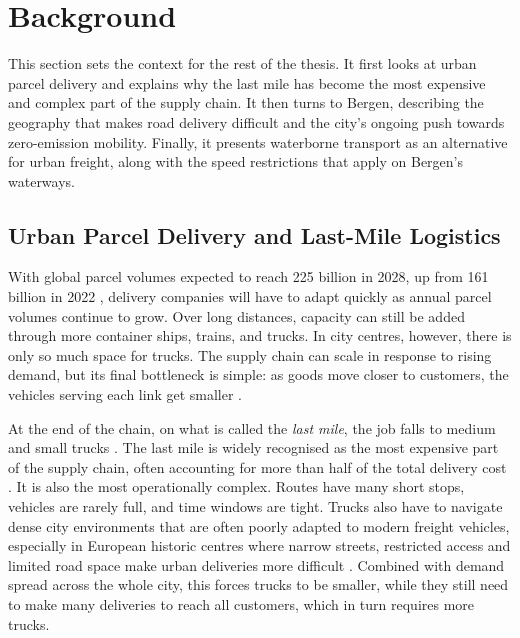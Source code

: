\documentclass[12pt]{article}
\begin{document}
\section{Background}
\label{sec:background}

This section sets the context for the rest of the thesis. It first looks at urban parcel delivery and explains why the last mile has become the most expensive and complex part of the supply chain. It then turns to Bergen, describing the geography that makes road delivery difficult and the city's ongoing push towards zero-emission mobility. Finally, it presents waterborne transport as an alternative for urban freight, along with the speed restrictions that apply on Bergen's waterways.

\subsection{Urban Parcel Delivery and Last-Mile Logistics}
\label{subsec:urban-parcel-delivery}

With global parcel volumes expected to reach \num{225} billion in 2028, up from \num{161} billion in 2022 \parencite{pitney_bowes_index_2023}, delivery companies will have to adapt quickly as annual parcel volumes continue to grow. Over long distances, capacity can still be added through more container ships, trains, and trucks. In city centres, however, there is only so much space for trucks. The supply chain can scale in response to rising demand, but its final bottleneck is simple: as goods move closer to customers, the vehicles serving each link get smaller \parencite{govuk2019lastmile}.

At the end of the chain, on what is called the \textit{last mile}, the job falls to medium and small trucks \parencite{govuk2019lastmile}. The last mile is widely recognised as the most expensive part of the supply chain, often accounting for more than half of the total delivery cost \parencite{savelsbergh2016}. It is also the most operationally complex. Routes have many short stops, vehicles are rarely full, and time windows are tight. Trucks also have to navigate dense city environments that are often poorly adapted to modern freight vehicles, especially in European historic centres where narrow streets, restricted access and limited road space make urban deliveries more difficult \parencite{BACHOFNER2022100020}. Combined with demand spread across the whole city, this forces trucks to be smaller, while they still need to make many deliveries to reach all customers, which in turn requires more trucks.
\end{document}

